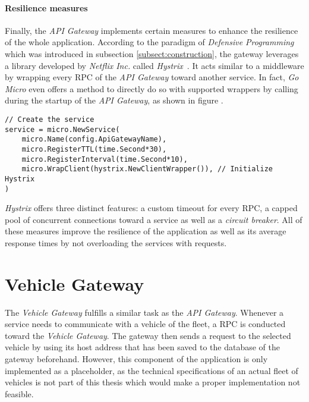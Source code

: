 \documentclass[12pt,a4paper,twoside]{report}
\begin{document}
\paragraph{Resilience measures}
Finally, the \textit{API Gateway} implements certain measures to enhance
the resilience of the whole application.
According to the paradigm of \textit{Defensive Programming} which was introduced
in subsection \ref{subsect:construction}, the gateway leverages a library
developed by \textit{Netflix Inc.} called \textit{Hystrix}~\cite{hystrix}.
It acts similar to a middleware by wrapping every RPC of the
\textit{API Gateway} toward another service.
In fact, \textit{Go Micro} even offers a method to directly do so with
supported wrappers by calling  during the startup
of the \textit{API Gateway}, as shown in figure .

\begin{lstlisting}[title=api-gateway/main.go, float, floatplacement=H]
// Create the service
service = micro.NewService(
	micro.Name(config.ApiGatewayName),
	micro.RegisterTTL(time.Second*30),
	micro.RegisterInterval(time.Second*10),
	micro.WrapClient(hystrix.NewClientWrapper()), // Initialize Hystrix
)
\end{lstlisting}

\textit{Hystrix} offers three distinct features:
a custom timeout for every RPC, a capped pool of concurrent connections toward
a service as well as a \textit{circuit breaker}.
All of these measures improve the resilience of the application
as well as its average response times by not overloading the services with requests.


\section{Vehicle Gateway}

The \textit{Vehicle Gateway} fulfills a similar task as the \textit{API Gateway}.
Whenever a service needs to communicate with a vehicle of the fleet, a RPC
is conducted toward the \textit{Vehicle Gateway}. The gateway then sends a request
to the selected vehicle by using its host address that has been saved to the
database of the gateway beforehand.
However, this component of the application is only implemented as a placeholder,
as the technical specifications of an actual fleet of vehicles is not part
of this thesis which would make a proper implementation not feasible.
\end{document}
